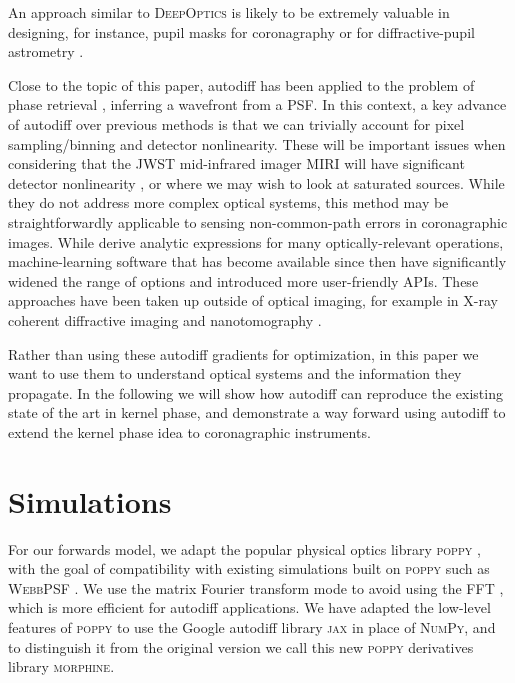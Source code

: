 \documentclass[modern]{aastex63}
\begin{document}
An approach similar to \textsc{DeepOptics} is likely to be extremely valuable in designing, for instance, pupil masks for coronagraphy \citep[e.g.][]{guyon03,carlotti11} or for diffractive-pupil astrometry \citep[e.g.][]{guyon12,tuthill18}. 

Close to the topic of this paper, autodiff has been applied to the problem of phase retrieval \citep{jurling14,paine19}, inferring a wavefront from a PSF. In this context, a key advance of autodiff over previous methods is that we can trivially account for pixel sampling/binning and detector nonlinearity. These will be important issues when considering that the JWST mid-infrared imager MIRI will have significant detector nonlinearity \citep{rieke15}, or where we may wish to look at saturated sources.  While they do not address more complex optical systems, this method may be straightforwardly applicable to sensing non-common-path errors in coronagraphic images. While \citet{jurling14} derive analytic expressions for many optically-relevant operations, machine-learning software that has become available since then have significantly widened the range of options and introduced more user-friendly APIs. These approaches have been taken up outside of optical imaging, for example in X-ray coherent diffractive imaging \citep{kandel19,nashed19} and nanotomography \citep{Dueaay3700}.

Rather than using these autodiff gradients for optimization, in this paper we want to use them to understand optical systems and the information they propagate.
In the following we will show how autodiff can reproduce the existing state of the art in kernel phase, and demonstrate a way forward using autodiff to extend the kernel phase idea to coronagraphic instruments.

\section{Simulations}
\label{sec:method}

For our forwards model, we adapt the popular physical optics library \textsc{poppy} \citep{poppy}, with the goal of compatibility with existing simulations built on \textsc{poppy} such as \textsc{WebbPSF} \citep{webbpsf}. We use the matrix Fourier transform mode to avoid using the FFT \citet{soummer07}, which is more efficient for autodiff applications. We have adapted the low-level features of \textsc{poppy} to use the Google autodiff library \textsc{jax} \citep{jax} in place of \textsc{NumPy}, and to distinguish it from the original version we call this new \textsc{poppy} derivatives library \textsc{morphine}. %
\end{document}
